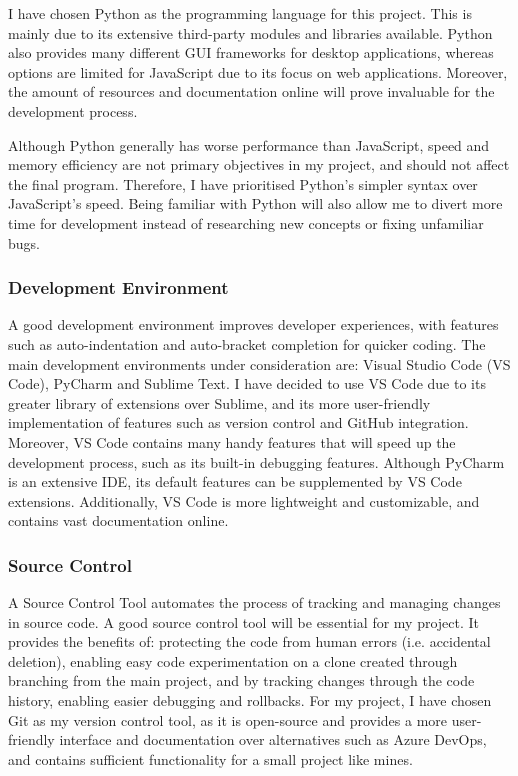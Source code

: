 \documentclass[../main/main.tex]{subfiles}
\begin{document}
I have chosen Python as the programming language for this project. This is mainly due to its extensive third-party modules and libraries available. Python also provides many different GUI frameworks for desktop applications, whereas options are limited for JavaScript due to its focus on web applications. Moreover, the amount of resources and documentation online will prove invaluable for the development process.

Although Python generally has worse performance than JavaScript, speed and memory efficiency are not primary objectives in my project, and should not affect the final program. Therefore, I have prioritised Python’s simpler syntax over JavaScript’s speed. Being familiar with Python will also allow me to divert more time for development instead of researching new concepts or fixing unfamiliar bugs.

\subsubsection{Development Environment}
A good development environment improves developer experiences, with features such as auto-indentation and auto-bracket completion for quicker coding. The main development environments under consideration are: Visual Studio Code (VS Code), PyCharm and Sublime Text. I have decided to use VS Code due to its greater library of extensions over Sublime, and its more user-friendly implementation of features such as version control and GitHub integration. Moreover, VS Code contains many handy features that will speed up the development process, such as its built-in debugging features. Although PyCharm is an extensive IDE, its default features can be supplemented by VS Code extensions. Additionally, VS Code is more lightweight and customizable, and contains vast documentation online.

\subsubsection{Source Control}
A Source Control Tool automates the process of tracking and managing changes in source code. A good source control tool will be essential for my project. It provides the benefits of: protecting the code from human errors (i.e. accidental deletion), enabling easy code experimentation on a clone created through branching from the main project, and by tracking changes through the code history, enabling easier debugging and rollbacks. For my project, I have chosen Git as my version control tool, as it is open-source and provides a more user-friendly interface and documentation over alternatives such as Azure DevOps, and contains sufficient functionality for a small project like mines.
\end{document}
